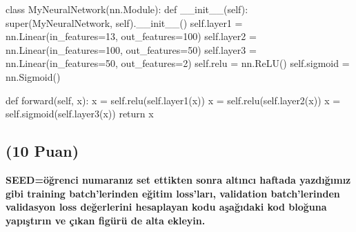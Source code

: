 \documentclass[11pt]{article}
\begin{document}
\clearpage
\begin{python}
class MyNeuralNetwork(nn.Module):
    def __init__(self):
        super(MyNeuralNetwork, self).__init__()
        self.layer1 = nn.Linear(in_features=13, out_features=100) 
        self.layer2 = nn.Linear(in_features=100, out_features=50)
        self.layer3 = nn.Linear(in_features=50, out_features=2)
        self.relu = nn.ReLU()
        self.sigmoid = nn.Sigmoid()
        
    def forward(self, x):
        x = self.relu(self.layer1(x))
        x = self.relu(self.layer2(x))
        x = self.sigmoid(self.layer3(x))
        return x

\end{python}

\subsection{(10 Puan)} \textbf{SEED=öğrenci numaranız set ettikten sonra altıncı haftada yazdığımız gibi training batch'lerinden eğitim loss'ları, validation batch'lerinden validasyon loss değerlerini hesaplayan kodu aşağıdaki kod bloğuna yapıştırın ve çıkan figürü de alta ekleyin.}
\end{document}
